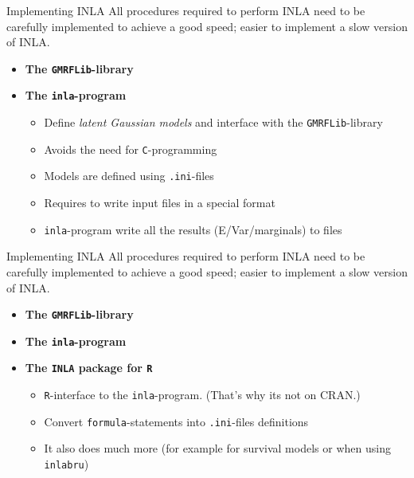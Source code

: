 \documentclass[
  handout]{beamer}
\providecommand{\tightlist}{%
  \setlength{\itemsep}{0pt}\setlength{\parskip}{0pt}}
\begin{document}
\begin{frame}[fragile]{Implementing INLA}
\protect\hypertarget{implementing-inla-1}{}
All procedures required to perform INLA need to be carefully implemented
to achieve a good speed; easier to implement a slow version of INLA.

\begin{itemize}
\item
  \textbf{The \texttt{GMRFLib}-library}
\item
  \textbf{The \texttt{inla}-program}

  \begin{itemize}
  \tightlist
  \item
    Define \emph{latent Gaussian models} and interface with the
    \texttt{GMRFLib}-library
  \item
    Avoids the need for \texttt{C}-programming
  \item
    Models are defined using \texttt{.ini}-files
  \item
    Requires to write input files in a special format
  \item
    \texttt{inla}-program write all the results (E/Var/marginals) to
    files
  \end{itemize}
\end{itemize}
\end{frame}

\begin{frame}[fragile]{Implementing INLA}
\protect\hypertarget{implementing-inla-2}{}
All procedures required to perform INLA need to be carefully implemented
to achieve a good speed; easier to implement a slow version of INLA.

\begin{itemize}
\item
  \textbf{The \texttt{GMRFLib}-library}
\item
  \textbf{The \texttt{inla}-program}
\item
  \textbf{The \texttt{INLA} package for \texttt{R}}

  \begin{itemize}
  \tightlist
  \item
    \texttt{R}-interface to the \texttt{inla}-program. (That's why its
    not on CRAN.)
  \item
    Convert \texttt{formula}-statements into \texttt{.ini}-files
    definitions
  \item
    It also does much more (for example for survival models or when
    using \texttt{inlabru})
  \end{itemize}
\end{itemize}
\end{frame}
\end{document}
